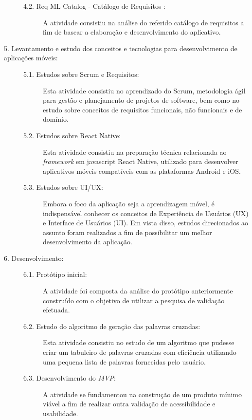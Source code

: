 \begin{description}
\begin{description}
    \item[4.2. Req ML Catalog - Catálogo de Requisitos \citep{soad2017reqml}:]
    A atividade consistiu na análise do referido catálogo de requisitos a fim de basear a elaboração e desenvolvimento do aplicativo.
\end{description}


\item[5. Levantamento e estudo dos conceitos e tecnologias para desenvolvimento de aplicações móveis:]
\hfill

\begin{description}
\item[5.1. Estudos sobre Scrum e Requisitos:] Esta atividade consistiu no aprendizado do Scrum, metodologia ágil para gestão e planejamento de projetos de software, bem como no estudo sobre conceitos de requisitos funcionais, não funcionais e de domínio.

\item[5.2. Estudos sobre React Native:] Esta atividade consistiu na preparação técnica relacionada ao \textit{framework} em javascript React Native, utilizado para desenvolver aplicativos móveis compatíveis com as plataformas Android e iOS.

\item[5.3. Estudos sobre UI/UX:] Embora o foco da aplicação seja a aprendizagem móvel, é indispensável conhecer os conceitos de Experiência de Usuários (UX) e Interface de Usuários (UI). Em vista disso, estudos direcionados ao assunto foram realizados a fim de possibilitar um melhor desenvolvimento da aplicação.

\end{description}

\item[6. Desenvolvimento:]
\hfill

\begin{description}
    \item[6.1. Protótipo inicial:]
    A atividade foi composta da análise do protótipo anteriormente construído com o objetivo de utilizar a pesquisa de validação efetuada.
    
    \item[6.2. Estudo do algoritmo de geração das palavras cruzadas:]
    Esta atividade consistiu no estudo de um algoritmo que pudesse criar um tabuleiro de palavras cruzadas com eficiência utilizando uma pequena lista de palavras fornecidas pelo usuário.
    
    \item[6.3. Desenvolvimento do \textit{MVP}:] 
    A atividade se fundamentou na construção de um produto mínimo viável a fim de realizar outra validação de acessibilidade e usabilidade.
\end{description}

\end{description}